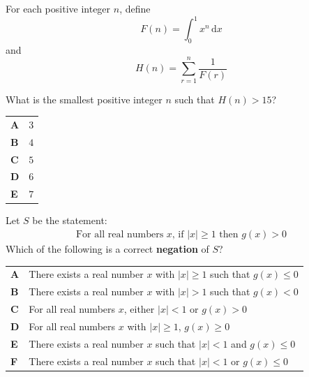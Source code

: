 \documentclass[11pt,a4paper]{article}
\begin{document}
\clearpage
\thispagestyle{djspaper}
\vspace*{8pt}
\begin{enumerate}[label=\textbf{\arabic*.},leftmargin=*,itemsep=0pt,start=13]
\questionitem[Integration]
For each positive integer $n$, define \[ F(n)=\int_0^1 x^n\,\mathrm{d}x \] and \[ H(n)=\sum_{r=1}^n \frac{1}{F(r)} \]

What is the smallest positive integer $n$ such that $H(n)>15$?

\par\vspace*{12pt}
\begin{tabularx}{\linewidth}{@{}>{\bfseries}l Y@{}}
A &
$3$
\\[0.8em]
B &
$4$
\\[0.8em]
C &
$5$
\\[0.8em]
D &
$6$
\\[0.8em]
E &
$7$
\\
\end{tabularx}
\end{enumerate}
\clearpage
\thispagestyle{djspaper}
\vspace*{8pt}
\begin{enumerate}[label=\textbf{\arabic*.},leftmargin=*,itemsep=0pt,start=14]
\questionitem[Logic]
Let $S$ be the statement: \[ \begin{array}{c}
\text{For all real numbers $x$, if $|x| \ge 1$ then $g(x) > 0$}
\end{array} \] Which of the following is a correct \textbf{negation} of $S$?

\par\vspace*{12pt}
\begin{tabularx}{\linewidth}{@{}>{\bfseries}l Y@{}}
A &
There exists a real number $x$ with $|x| \ge 1$ such that $g(x) \le 0$
\\[0.8em]
B &
There exists a real number $x$ with $|x| > 1$ such that $g(x) < 0$
\\[0.8em]
C &
For all real numbers $x$, either $|x| < 1$ or $g(x) > 0$
\\[0.8em]
D &
For all real numbers $x$ with $|x| \ge 1$, $g(x) \ge 0$
\\[0.8em]
E &
There exists a real number $x$ such that $|x| < 1$ and $g(x) \le 0$
\\[0.8em]
F &
There exists a real number $x$ such that $|x| < 1$ or $g(x) \le 0$
\\
\end{tabularx}
\end{enumerate}
\end{document}
